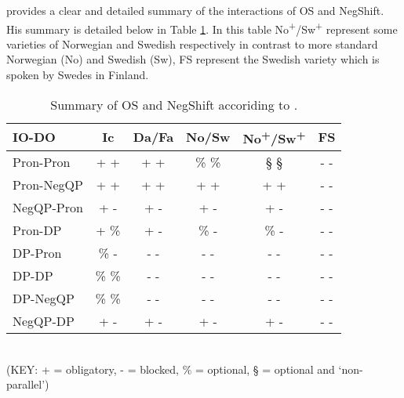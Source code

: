 \documentclass[12pt, letterpaper]{article}
\begin{document}
\ea \citet{christensenInterfacesNegationSyntax2005} provides a clear and detailed summary of the interactions of OS and NegShift. His summary is detailed below in Table \ref{tab:OSNEGS}.
\ex In this table No\textsuperscript{+}/Sw\textsuperscript{+} represent some varieties of Norwegian and Swedish respectively in contrast to more standard Norwegian (No) and Swedish (Sw), FS represent the Swedish variety which is spoken by Swedes in Finland.
\begin{table}[h!]
\centering
\caption{Summary of OS and NegShift accoriding to \citet{christensenInterfacesNegationSyntax2005}.}
\label{tab:OSNEGS}
\begin{tabular}{lccccc}
\hline
IO-DO & Ic & Da/Fa & No/Sw & No\textsuperscript{+}/Sw\textsuperscript{+} & FS  \\
\hline 
Pron-Pron	&	+ +	&	+ +	&	\% \%	&	§ §	&	- -	\\
Pron-NegQP	&	+ +	&	+ +	&	+ +	&	+ +	&	- -	\\
NegQP-Pron	&	+ -	&	+ -	&	+ -	&	+ -	&	- -	\\
Pron-DP	&	+ \%	&	+ -	&	\% -	&	\% -	&	- -	\\
DP-Pron	&	\% -	&	- -	&	- -	&	- -	&	- -	\\
DP-DP	&	\% \%	&	- -	&	- -	&	- -	&	- -	\\
DP-NegQP	&	\% \%	&	- -	&	- -	&	- -	&	- -	\\
NegQP-DP	&	+ -	&	+ -	&	+ -	&	+ -	&	- -	\\
\hline 
\end{tabular}\\
(KEY: + = obligatory, - = blocked, \% = optional, § = optional and `non-parallel’)
\end{table}
\end{document}
